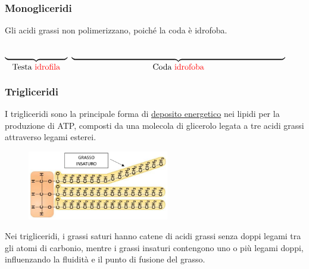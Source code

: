 \documentclass{article}
\begin{document}
\subsubsection{Monogliceridi}
Gli acidi grassi non polimerizzano, poiché la coda è idrofoba.
\begin{center}

\end{center}
\hspace*{1.725cm}   
$\underbrace{{\begin{array}{c}
    \phantom{CIAOCIAOC}
\end{array}}}_{\text{\normalsize Testa {\color{red}{idrofila}}}}$
\hspace*{1.5cm}   
$\underbrace{{\begin{array}{c}
    \phantom{CIAOCIAOCIAOCIAOCIAOCIAOCIAOCIAOCIA}
\end{array}}}_{\text{\normalsize Coda {\color{red}{idrofoba}}}}$

\subsubsection{Trigliceridi}
I trigliceridi sono la principale forma di \underline{deposito energetico} nei lipidi per la
produzione di ATP, composti da una molecola di glicerolo legata a tre acidi grassi attraverso
legami esterei.
\begin{figure}[ht!]
    \begin{center}
        \includegraphics[width=0.55\textwidth]{media/trigliceridi.png}
    \end{center}
\end{figure}

Nei trigliceridi, i grassi saturi hanno catene di acidi grassi senza doppi legami tra gli atomi
di carbonio, mentre i grassi insaturi contengono uno o più legami doppi, influenzando la
fluidità e il punto di fusione del grasso.
\end{document}
